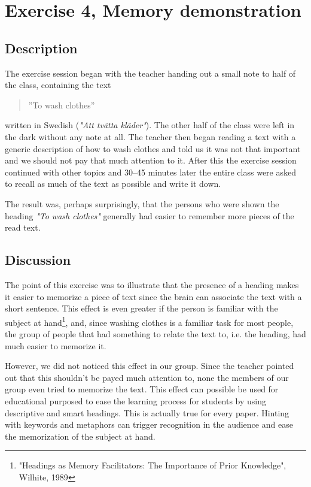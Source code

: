 \documentclass[10pt, a4paper]{article}
\begin{document}
\section{Exercise 4, Memory demonstration}
\subsection{Description}
The exercise session began with the teacher handing out a small note to half of the class, containing the text \begin{quote}''To wash clothes''\end{quote} written in Swedish (\emph{"Att tvätta kläder"}). The other half of the class were left in the dark without any note at all. The teacher then began reading a text with a generic description of how to wash clothes and told us it was not that important and we should not pay that much attention to it. After this the exercise session continued with other topics and 30--45 minutes later the entire class were asked to recall as much of the text as possible and write it down.

The result was, perhaps surprisingly, that the persons who were shown the heading \emph{"To wash clothes"} generally had easier to remember more pieces of the read text.

\subsection{Discussion}
The point of this exercise was to illustrate that the presence of a heading makes it easier to memorize a piece of text since the brain can associate the text with a short sentence. This effect is even greater if the person is familiar with the subject at hand\footnote{"Headings as Memory Facilitators: The Importance of Prior Knowledge", Wilhite, 1989}, and, since washing clothes is a familiar task for most people, the group of people that had something to relate the text to, i.e. the heading, had much easier to memorize it.

However, we did not noticed this effect in our group. Since the teacher pointed out that this shouldn't be payed much attention to, none the members of our group even tried to memorize the text. This effect can possible be used for educational purposed to ease the learning process for students by using descriptive and smart headings. This is actually true for every paper. Hinting with keywords and metaphors can trigger recognition in the audience and ease the memorization of the subject at hand.
\end{document}
